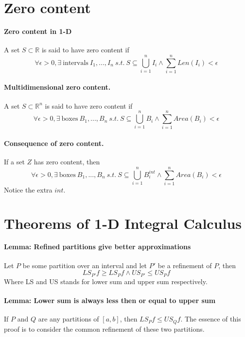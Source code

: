 \documentclass[11pt]{article}
\newcommand{\real}[0]{\mathbb{R}}
\begin{document}
\section{Zero content}
\paragraph{Zero content in 1-D} A set $S\subset \real$ is said to have zero content if
\begin{equation*}
    \forall \epsilon > 0, \exists~\text{intervals}~I_1,...,I_n ~s.t.~ S\subseteq \bigcup_{i=1}^{n}I_i \wedge \sum_{i=1}^{n}{Len(I_i)} < \epsilon
\end{equation*}

\paragraph{Multidimensional zero content.} A set $S\subset \real^n$ is said to have zero content if
\begin{equation*}
    \forall \epsilon > 0, \exists~\text{boxes}~B_1,...,B_n~s.t.~S\subseteq \bigcup_{i=1}^{n}B_i \wedge \sum_{i=1}^{n}{Area(B_i)} < \epsilon
\end{equation*}

\paragraph{Consequence of zero content.}If a set $Z$ has zero content, then
\begin{equation*}
    \forall \epsilon>0, \exists~\text{boxes}~B_1,...,B_n~s.t.~ S\subseteq \bigcup_{i=1}^{n}B^{int}_i \wedge \sum_{i=1}^{n}{Area(B_i)} < \epsilon
\end{equation*}
Notice the extra $int$.
\section{Theorems of 1-D Integral Calculus}
\paragraph{Lemma: Refined partitions give better approximations} Let $P$ be some partition over an interval and let $P'$ be a refinement of $P$, then
\begin{equation*}
    LS_{P'}f \geq LS_{P}f \wedge US_{P'} \leq US_{P}f
\end{equation*}
Where LS and US stands for lower sum and upper sum respectively.

\paragraph{Lemma: Lower sum is always less then or equal to upper sum} If $P$ and $Q$ are any partitions of $[a,b]$, then $LS_Pf \leq US_Qf$. The essence of this proof is to consider the common refinement of these two partitions.
\end{document}
